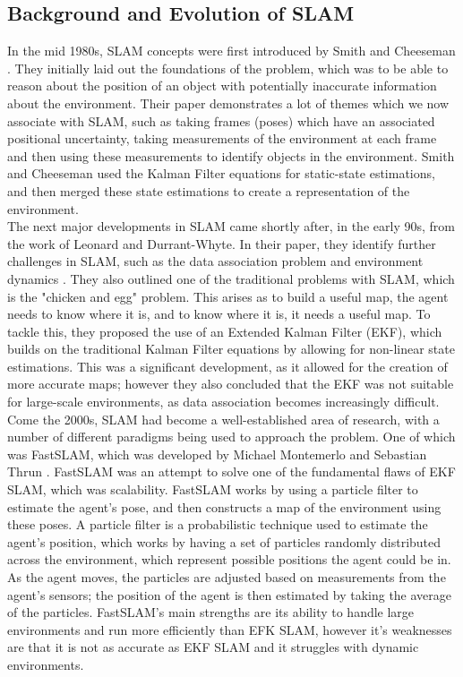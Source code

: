 \documentclass[12pt]{article}
\begin{document}
\subsection{Background and Evolution of SLAM} %
In the mid 1980s, SLAM concepts were first introduced by Smith and Cheeseman \cite{Early_SLAM}.
They initially laid out the foundations of the problem, which was to be able to reason about the position of an object with potentially
inaccurate information about the environment.
Their paper demonstrates a lot of themes which we now associate with SLAM, such as taking frames (poses) which have an
associated positional uncertainty, taking measurements of the environment at each frame and then using these measurements
to identify objects in the environment.
Smith and Cheeseman used the Kalman Filter equations for static-state estimations, and then merged these state estimations
to create a representation of the environment.\\
The next major developments in SLAM came shortly after, in the early 90s, from the work of Leonard and Durrant-Whyte.
In their paper, they identify further challenges in SLAM, such as the data association problem and environment dynamics \cite{First_EKF}.
They also outlined one of the traditional problems with SLAM, which is the "chicken and egg" problem.
This arises as to build a useful map, the agent needs to know where it is, and to know where it is, it needs a useful map.
To tackle this, they proposed the use of an Extended Kalman Filter (EKF), which builds on the traditional Kalman Filter equations by allowing for non-linear state estimations.
This was a significant development, as it allowed for the creation of more accurate
maps; however they also concluded that the EKF was not suitable for large-scale environments, as data association becomes
increasingly difficult.\\
Come the 2000s, SLAM had become a well-established area of research, with a number of different paradigms being used to approach the problem.
One of which was FastSLAM, which was developed by Michael Montemerlo and Sebastian Thrun \cite{FastSLAM}.
FastSLAM was an attempt to solve one of the fundamental flaws of EKF SLAM, which was scalability.
FastSLAM works by using a particle filter to estimate the agent's pose, and then constructs a map of the environment using these poses.
A particle filter is a probabilistic technique used to estimate the agent's position, which works by having a set of particles randomly distributed
across the environment, which represent possible positions the agent could be in.
As the agent moves, the particles are adjusted based on measurements from the agent's sensors; the position of the agent is then estimated by
taking the average of the particles.
FastSLAM's main strengths are its ability to handle large environments and run more efficiently than EFK SLAM, however
it's weaknesses are that it is not as accurate as EKF SLAM and it struggles with dynamic environments.\\
\end{document}
